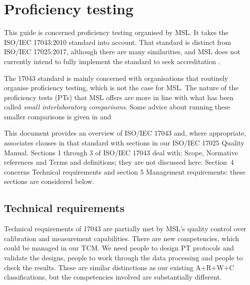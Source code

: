 \section{Proficiency testing}
This guide is concerned proficiency testing organised by MSL. It takes the ISO/IEC 17043:2010 standard into account. That standard is distinct from ISO/IEC 17025:2017, although there are many similarities, and MSL does not currently intend to fully implement the standard to seek accreditation \cite{BSI:proficiency}. 

The 17043 standard is mainly concerned with organisations that routinely organise proficiency testing, which is not the case for MSL. The nature of the proficiency tests (PTs) that MSL offers are more in line with what has been called \textit{small interlaboratory comparisons}. Some advice about running these smaller comparisons is given in \cite{Milde:2020} and \cite{EA-4/21}

This document provides an overview of ISO/IEC 17043 and, where appropriate, associates clauses in that standard with sections in our ISO/IEC 17025 Quality Manual. 
Sections 1 through 3 of ISO/IEC 17043 deal with: Scope, Normative references and Terms and definitions; they are not discussed here. Section~4 concerns Technical requirements and section 5 Management requirements: these sections are considered below.

\subsection{Technical requirements}

Technical requirements of 17043 are partially met by MSL's quality control over calibration and measurement capabilities. There are new competencies, which could be managed in our TCM. We need people to design PT protocols and validate the designs, people to work through the data processing and people to check the results. These are similar distinctions as our existing A+R+W+C classifications, but the competencies involved are substantially different.

